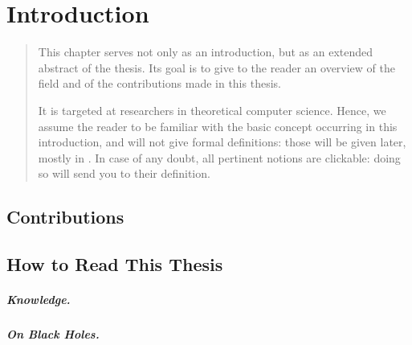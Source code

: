 \chapter{Introduction}

\begin{chapterpresentation}
	\begin{abstract}
		This chapter serves not only as an introduction, but as an extended
		abstract of the thesis. Its goal is to give to the reader an overview
		of the field and of the contributions made in this thesis.
		
		It is targeted at researchers in theoretical computer science.
		Hence, we assume the reader to be familiar with the basic concept occurring in
		this introduction, and will not give formal definitions: those
		will be given later, mostly in .
		In case of any doubt, all pertinent notions are clickable: doing so
		will send you to their definition.
	\end{abstract}
\end{chapterpresentation}

\chaptertoc





\section{Contributions}

\section{How to Read This Thesis}

\paragraph*{Knowledge.}

\paragraph*{On Black Holes.}
